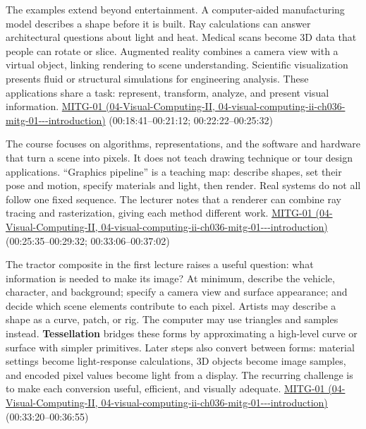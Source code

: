 The examples extend beyond entertainment. A computer-aided manufacturing model describes a shape before it is built. Ray calculations can answer architectural questions about light and heat. Medical scans become 3D data that people can rotate or slice. Augmented reality combines a camera view with a virtual object, linking rendering to scene understanding. Scientific visualization presents fluid or structural simulations for engineering analysis. These applications share a task: represent, transform, analyze, and present visual information. \href{../04-Visual-Computing-II/main.pdf\#nameddest=04-visual-computing-ii-ch036-mitg-01---introduction}{MITG-01 (04-Visual-Computing-II, 04-visual-computing-ii-ch036-mitg-01-\/-\/-introduction)} (00:18:41--00:21:12; 00:22:22--00:25:32)

The course focuses on algorithms, representations, and the software and hardware that turn a scene into pixels. It does not teach drawing technique or tour design applications. ``Graphics pipeline'' is a teaching map: describe shapes, set their pose and motion, specify materials and light, then render. Real systems do not all follow one fixed sequence. The lecturer notes that a renderer can combine ray tracing and rasterization, giving each method different work. \href{../04-Visual-Computing-II/main.pdf\#nameddest=04-visual-computing-ii-ch036-mitg-01---introduction}{MITG-01 (04-Visual-Computing-II, 04-visual-computing-ii-ch036-mitg-01-\/-\/-introduction)} (00:25:35--00:29:32; 00:33:06--00:37:02)

The tractor composite in the first lecture raises a useful question: what information is needed to make its image? At minimum, describe the vehicle, character, and background; specify a camera view and surface appearance; and decide which scene elements contribute to each pixel. Artists may describe a shape as a curve, patch, or rig. The computer may use triangles and samples instead. \textbf{Tessellation} bridges these forms by approximating a high-level curve or surface with simpler primitives. Later steps also convert between forms: material settings become light-response calculations, 3D objects become image samples, and encoded pixel values become light from a display. The recurring challenge is to make each conversion useful, efficient, and visually adequate. \href{../04-Visual-Computing-II/main.pdf\#nameddest=04-visual-computing-ii-ch036-mitg-01---introduction}{MITG-01 (04-Visual-Computing-II, 04-visual-computing-ii-ch036-mitg-01-\/-\/-introduction)} (00:33:20--00:36:55)

